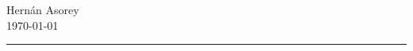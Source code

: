 \documentclass[11pt, a4paper]{article}
\newif\ifres
\begin{document}




\ifres
~
\else

\fi



\ifres

\else

















\fi

\vspace{2cm}
\begin{flushright}
Hernán Asorey\\
\today
\end{flushright}
\hrule
\end{document}
